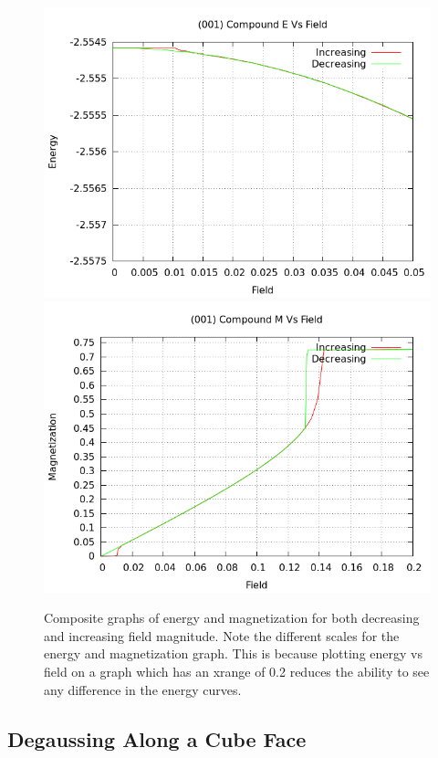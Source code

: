 \begin{figure}[ht]
\centering
\includegraphics[scale=0.5]{25june16/HVariedData/compoundEM/001Ecompound.png}
\includegraphics[scale=0.5]{25june16/HVariedData/compoundEM/001Mcompound.png}
\caption{Composite graphs of energy and magnetization for both decreasing and increasing field magnitude. Note the
different scales for the energy and magnetization graph. This is because plotting energy vs field on a graph
which has an xrange of 0.2 reduces the ability to see any difference in the energy curves.}
\end{figure}
\clearpage
\subsection{Degaussing Along a Cube Face}
